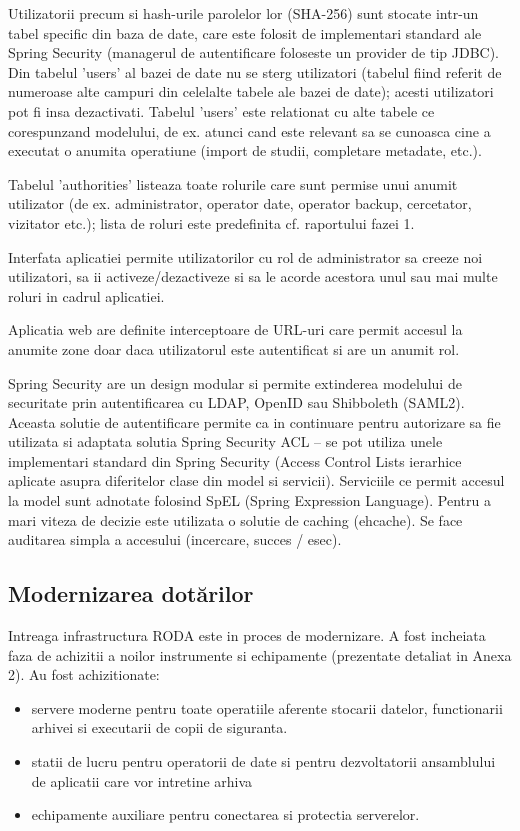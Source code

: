 \documentclass[a4paper, 10pt]{article}
\begin{document}
{\medskip

Utilizatorii precum si hash-urile parolelor lor (SHA-256) sunt stocate intr-un tabel specific din baza de date, care este folosit de implementari standard ale Spring Security (managerul de autentificare foloseste un provider de tip JDBC). 
Din tabelul 'users' al bazei de date nu se sterg utilizatori (tabelul fiind referit de numeroase alte campuri din celelalte tabele ale bazei de date); acesti utilizatori pot fi insa dezactivati.
Tabelul 'users' este relationat cu alte tabele ce corespunzand modelului, de ex. atunci cand este relevant sa se cunoasca cine a executat o anumita operatiune (import de studii, completare metadate, etc.).

Tabelul 'authorities' listeaza toate rolurile care sunt permise unui anumit utilizator (de ex. administrator, operator date, operator backup, cercetator, vizitator etc.); lista de roluri este predefinita cf. raportului fazei 1.

\medskip

Interfata aplicatiei permite utilizatorilor cu rol de administrator sa creeze noi utilizatori, sa ii activeze/dezactiveze si sa le acorde acestora unul sau mai multe roluri in cadrul aplicatiei.

Aplicatia web are definite interceptoare de URL-uri care permit accesul la anumite zone doar daca utilizatorul este autentificat si are un anumit rol.

\medskip

Spring Security are un design modular si permite extinderea modelului de securitate prin autentificarea cu LDAP, OpenID sau Shibboleth (SAML2).
Aceasta solutie de autentificare permite ca in continuare pentru autorizare sa fie utilizata si adaptata solutia Spring Security ACL --
se pot utiliza unele implementari standard din Spring Security (Access Control Lists ierarhice aplicate asupra diferitelor clase din model si servicii). 
Serviciile ce permit accesul la model sunt adnotate folosind SpEL
(Spring Expression Language).
Pentru a mari viteza de decizie este utilizata o solutie de caching (ehcache). 
Se face auditarea simpla a accesului (incercare, succes / esec). 

\medskip

\subsection*{Modernizarea dot\u{a}rilor}

\medskip

Intreaga infrastructura RODA este in proces de modernizare. 
A fost incheiata faza de achizitii a noilor instrumente si echipamente (prezentate detaliat in Anexa 2). Au
fost achizitionate:
\begin{itemize}
\item servere moderne pentru toate operatiile aferente stocarii datelor,
functionarii arhivei si executarii de copii de siguranta.
\item statii de lucru pentru operatorii de date si pentru dezvoltatorii
ansamblului de aplicatii care vor intretine arhiva
\item echipamente auxiliare pentru conectarea si protectia serverelor.
\end{itemize}

}
\end{document}
